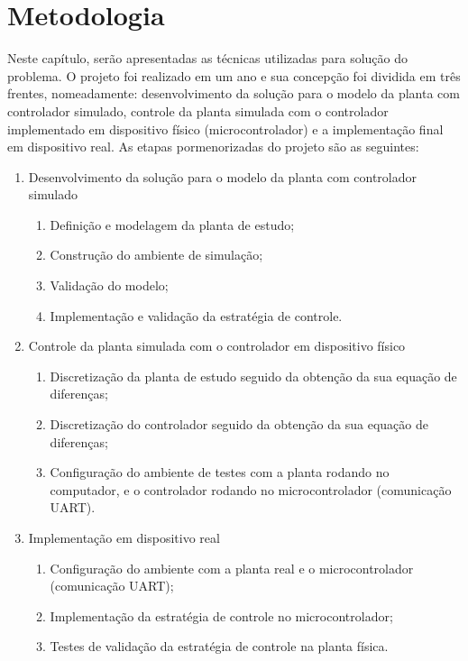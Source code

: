 \chapter{Metodologia}

Neste capítulo, serão apresentadas as técnicas utilizadas para solução do problema. O projeto 
foi realizado em um ano e sua concepção foi dividida em três frentes, nomeadamente: desenvolvimento 
da solução para o modelo da planta com controlador simulado, controle da planta simulada com o 
controlador implementado em dispositivo físico (microcontrolador) e a implementação final em dispositivo real. 
As etapas pormenorizadas do projeto são as seguintes:

\begin{enumerate}
 \item Desenvolvimento da solução para o modelo da planta com controlador simulado
  \begin{enumerate}
    \item Definição e modelagem da planta de estudo;
    \item Construção do ambiente de simulação;
    \item Validação do modelo;
    \item Implementação e validação da estratégia de controle.
  \end{enumerate}
 \item Controle da planta simulada com o controlador em dispositivo físico
  \begin{enumerate}
    \item Discretização da planta de estudo seguido da obtenção da sua equação de diferenças;
    \item Discretização do controlador seguido da obtenção da sua equação de diferenças;
    \item Configuração do ambiente de testes com a planta rodando no computador, e o 
    controlador rodando no microcontrolador (comunicação UART).
  \end{enumerate}
  \item Implementação em dispositivo real
  \begin{enumerate}
    \item Configuração do ambiente com a planta real e o microcontrolador (comunicação UART);
    \item Implementação da estratégia de controle no microcontrolador;
    \item Testes de validação da estratégia de controle na planta física.
  \end{enumerate}
\end{enumerate}

